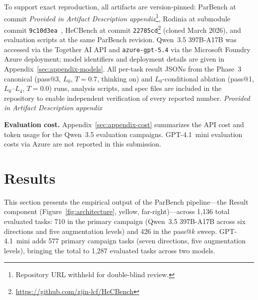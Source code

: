 \documentclass[conference]{IEEEtran}
\newcommand{\pending}[1]{\textit{Provided in Artifact Description appendix}}
\begin{document}
To support exact reproduction, all artifacts are version-pinned: ParBench at commit \pending{Phase-3 head}\footnote{Repository URL withheld for double-blind review.}, Rodinia at submodule commit \texttt{9c10d3ea}~\cite{Rodinia2009}, HeCBench at commit \texttt{22785cd}\footnote{\url{https://github.com/zjin-lcf/HeCBench}} (cloned March 2026), and evaluation scripts at the same ParBench revision. Qwen~3.5 397B-A17B was accessed via the Together AI API and \texttt{azure-gpt-5.4} via the Microsoft Foundry Azure deployment; model identifiers and deployment details are given in Appendix~\ref{sec:appendix-models}. All per-task result JSONs from the Phase~3 canonical (pass@3, $L_0$, $T{=}0.7$, thinking on) and $L_0$-conditional ablation (pass@1, $L_0$--$L_4$, $T{=}0.0$) runs, analysis scripts, and spec files are included in the repository to enable independent verification of every reported number. \pending{Exact JSON counts per model and direction — populate from Phase~3 results after launch.}

\textbf{Evaluation cost.} Appendix~\ref{sec:appendix-cost} summarizes the API cost and token usage for the Qwen~3.5 evaluation campaigns. GPT-4.1~mini evaluation costs via Azure are not reported in this submission.

\section{Results}
\label{sec:results}

This section presents the empirical output of the ParBench pipeline---the Result component (Figure~\ref{fig:architecture}, yellow, far-right)---across 1{,}136 total evaluated tasks: 710 in the primary campaign (Qwen~3.5 397B-A17B across six directions and five augmentation levels) and 426 in the pass@$k$ sweep. GPT-4.1~mini adds 577 primary campaign tasks (seven directions, five augmentation levels), bringing the total to 1{,}287 evaluated tasks across two models. %
\end{document}
